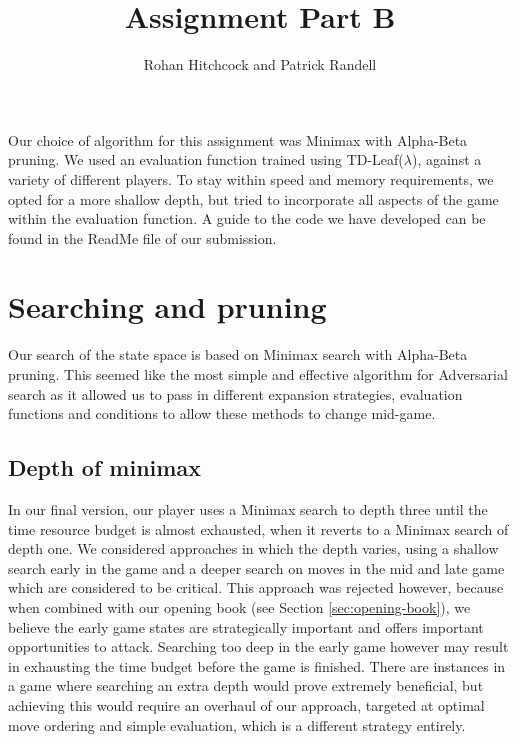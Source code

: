 \documentclass[11pt]{article}
\newcommand{\drafting}[1]{\textcolor{OliveGreen}{#1}}
\begin{document}
\title{\textbf{Assignment Part B}}
\author{Rohan Hitchcock and Patrick Randell}
\date{}
\maketitle

\drafting{
Our choice of algorithm for this assignment was Minimax with Alpha-Beta pruning. We used an evaluation function trained using TD-Leaf($\lambda$), against a variety of different players.
To stay within speed and memory requirements, we opted for a more shallow depth, but tried to incorporate all aspects of the game within the evaluation function. A guide to the code we have developed can be found in the ReadMe file of our submission.
}

\section{Searching and pruning}
Our search of the state space is based on Minimax search with Alpha-Beta pruning. \drafting{This seemed like the most simple and effective algorithm for Adversarial search as it allowed us to pass in different expansion strategies, evaluation functions and conditions to allow these methods to change mid-game.}

\subsection{Depth of minimax}
In our final version, our player uses a Minimax search to depth three until the time resource budget is almost exhausted, when it reverts to a Minimax search of depth one. We considered approaches in which the depth varies, using a shallow search early in the game and a deeper search on moves in the mid and late game which are considered to be critical. This approach was rejected however, because when combined with our opening book (see Section \ref{sec:opening-book}), we believe the early game states are strategically important and offers important opportunities to attack. Searching too deep in the early game however may result in exhausting the time budget before the game is finished. \drafting{There are instances in a game where searching an extra depth would prove extremely beneficial, but achieving this would require an overhaul of our approach, targeted at optimal move ordering and simple evaluation, which is a different strategy entirely.}
\end{document}

